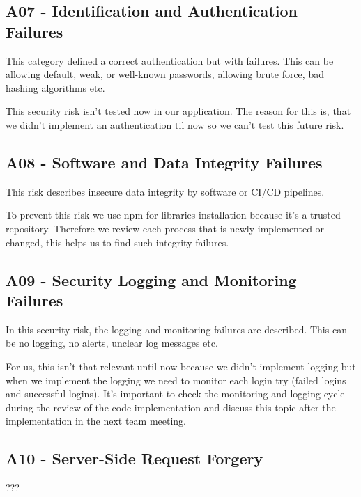 \subsection{A07 - Identification and Authentication Failures}
This category defined a correct authentication but with failures. This can be allowing default, weak, or well-known passwords, allowing brute force, bad hashing algorithms etc.

This security risk isn't tested now in our application. The reason for this is, that we didn't implement an authentication til now so we can't test this future risk.

\subsection{A08 - Software and Data Integrity Failures}
This risk describes insecure data integrity by software or CI/CD pipelines.

To prevent this risk we use npm for libraries installation because it's a trusted repository. Therefore we review each process that is newly implemented or changed, this helps us to find such integrity failures.

\subsection{A09 - Security Logging and Monitoring Failures}
In this security risk, the logging and monitoring failures are described. This can be no logging, no alerts, unclear log messages etc.

For us, this isn't that relevant until now because we didn't implement logging but when we implement the logging we need to monitor each login try (failed logins and successful logins). It's important to check the monitoring and logging cycle during the review of the code implementation and discuss this topic after the implementation in the next team meeting.

\subsection{A10 - Server-Side Request Forgery}
???